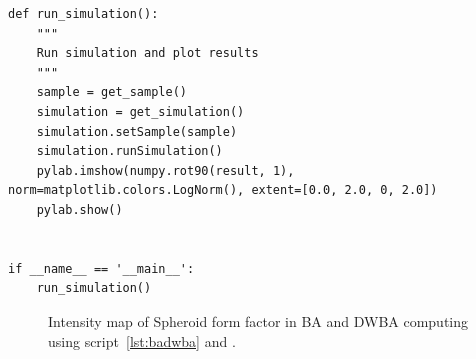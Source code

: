 \begin{lstlisting}
def run_simulation():
    """
    Run simulation and plot results
    """
    sample = get_sample()
    simulation = get_simulation()
    simulation.setSample(sample)
    simulation.runSimulation()
    pylab.imshow(numpy.rot90(result, 1), norm=matplotlib.colors.LogNorm(), extent=[0.0, 2.0, 0, 2.0])
    pylab.show()
 

if __name__ == '__main__': 
    run_simulation()
\end{lstlisting}


\begin{figure}[ht]
\hfill
{}
\hfill
{}
\hfill
\caption{Intensity map of Spheroid form factor in BA and DWBA computing using script~\ref{lst:badwba} and  .}
\label{fig:spheroidbadwba}
\end{figure}


\FloatBarrier 



